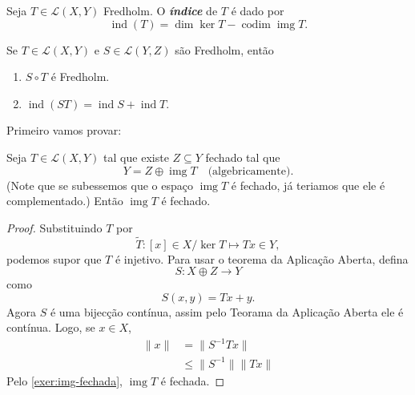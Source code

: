 \documentclass[portuguese]{article}
\theoremstyle{definition}
\DeclareMathOperator{\img}{img}
\begin{document}
\begin{defn}
	Seja $T\in\mathcal{L}(X,Y)$ Fredholm. O \textbf{\textit{índice}} de $T$ é dado por
	\[\operatorname{ind}(T)=\dim\ker T-\operatorname{codim}\img T.\]
\end{defn}
\begin{teo}\label{teo:fredholm-conditions}
	Se $T\in\mathcal{L}(X,Y)$ e $S\in\mathcal{L}(Y,Z)$ são Fredholm, então
	\begin{enumerate}
		\item $S\circ T$ é Fredholm.
		\item $\operatorname{ind}(ST)=\operatorname{ind}S 
		+\operatorname{ind}T$.
	\end{enumerate}
\end{teo}
Primeiro vamos provar:
\begin{prop}
	Seja $T\in\mathcal{L}(X,Y)$ tal que existe $Z\subseteq Y$ fechado tal que
	\[Y=Z\oplus\img T\quad\text{(algebricamente)}.\]
	(Note que se subessemos que o espaço $\img T$ é fechado, já teriamos que ele é complementado.) Então $\img T$ é fechado.
\end{prop}
\begin{proof}
	Substituindo $T$ por 
	\[\tilde{T}:[x]\in X/\ker T\mapsto Tx\in Y,\]
	podemos supor que $T$ é injetivo. Para usar o teorema da Aplicação Aberta, defina
	\[S:X\oplus Z\to Y\]
	como
	\[S(x,y)=Tx+y.\]
	Agora $S$ é uma bijecção contínua, assim pelo Teorama da Aplicação Aberta ele é contínua. Logo, se $x\in X$,
	\begin{align*}
		\|x\|&=\|S^{-1}Tx\|\\
		&\leq\|S^{-1}\|\|Tx\|
	\end{align*}
	Pelo \cref{exer:img-fechada}, $\img T$ é fechada.
\end{proof}
\end{document}
